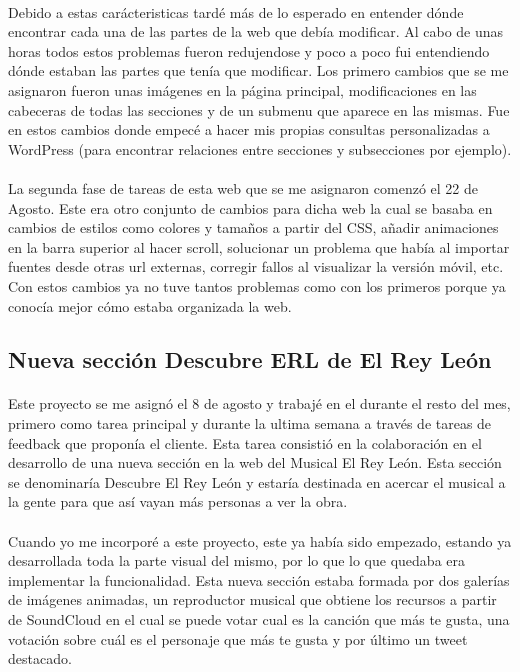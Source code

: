 \documentclass[10pt, a4paper,spanish]{article}
\begin{document}
            \paragraph{}
            Debido a estas carácteristicas tardé más de lo esperado en entender dónde encontrar cada una de las partes de la web que debía modificar. Al cabo de unas horas todos estos problemas fueron redujendose y poco a poco fui entendiendo dónde estaban las partes que tenía que modificar. Los primero cambios que se me asignaron fueron unas imágenes en la página principal, modificaciones en las cabeceras de todas las secciones y de un submenu que aparece en las mismas. Fue en estos cambios donde empecé a hacer mis propias consultas personalizadas a WordPress (para encontrar relaciones entre secciones y subsecciones por ejemplo).

            \paragraph{}
            La segunda fase de tareas de esta web que se me asignaron comenzó el 22 de Agosto. Este era otro conjunto de cambios para dicha web la cual se basaba en cambios de estilos como colores y tamaños a partir del CSS, añadir animaciones en la barra superior al hacer scroll, solucionar un problema que había al importar fuentes desde otras url externas, corregir fallos al visualizar la versión móvil, etc. Con estos cambios ya no tuve tantos problemas como con los primeros porque ya conocía mejor cómo estaba organizada la web.


        \subsection{Nueva sección Descubre ERL de El Rey León}

            \paragraph{}
            Este proyecto se me asignó el 8 de agosto y trabajé en el durante el resto del mes, primero como tarea principal y durante la ultima semana a través de tareas de feedback que proponía el cliente. Esta tarea consistió en la colaboración en el desarrollo de una nueva sección en la web del Musical El Rey León. Esta sección se denominaría Descubre El Rey León y estaría destinada en acercar el musical a la gente para que así vayan más personas a ver la obra.

            \paragraph{}
            Cuando yo me incorporé a este proyecto, este ya había sido empezado, estando ya desarrollada toda la parte visual del mismo, por lo que lo que quedaba era implementar la funcionalidad. Esta nueva sección estaba formada por dos galerías  de imágenes animadas, un reproductor musical que obtiene los recursos a partir de SoundCloud en el cual se puede votar cual es la canción que más te gusta, una votación sobre cuál es el personaje que más te gusta y por último un tweet destacado.
\end{document}
